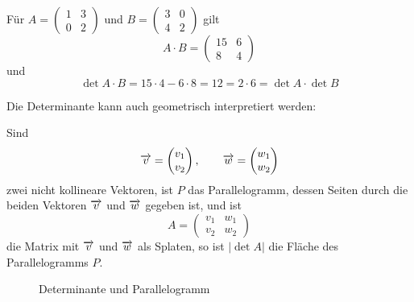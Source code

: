 \begin{beispiel} Für $A = \left( \begin{smallmatrix} 1 & 3 \\ 0 & 2 \end{smallmatrix} \right)$ und 
$B = \left( \begin{smallmatrix} 3 & 0 \\ 4 & 2 \end{smallmatrix} \right)$ gilt
  	$$ A \cdot B = \left( \begin{matrix} 15 & 6 \\ 8 & 4 \end{matrix} \right) $$
und 
  	$$ \det{A \cdot B} = 15 \cdot 4 - 6 \cdot 8 = 12 = 2 \cdot 6 = \det{A} \cdot \det{B} $$
\end{beispiel}

\bigbreak

Die Determinante kann auch geometrisch interpretiert werden:


\begin{satz}\label{det_2_geom} Sind 
  	$$\overrightarrow{v} = \left( \begin{matrix} v_1 \\ v_2 \end{matrix} \right), \qquad 
     	\overrightarrow{w} = \left( \begin{matrix} w_1 \\ w_2 \end{matrix} \right) $$ 
zwei nicht kollineare Vektoren, ist $P$ das Parallelogramm, dessen Seiten durch die beiden Vektoren 
$\overrightarrow{v}$ und $\overrightarrow{w}$ gegeben ist, und ist 
  	$$ A = \left( \begin{matrix} v_1 & w_1 \\ v_2 & w_2 \end{matrix} \right) $$
die Matrix mit $\overrightarrow{v}$ und $\overrightarrow{w}$ als Splaten, so ist $\vert \det{A} \vert$ die Fläche 
des Parallelogramms $P$.
\end{satz}

\begin{figure}[h]
	\vspace{-0.5cm}
	\begin{center}
	\begin{scaletikzpicturetowidth}{\hsize}
     		 
	\end{scaletikzpicturetowidth}
	\vspace{-0.5cm}
	\caption{Determinante und Parallelogramm}\label{lin:05_det_1000}
	\end{center}
	\vspace{-0.6cm}
\end{figure}

